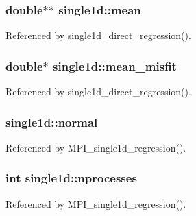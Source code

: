 \subsubsection[{\texorpdfstring{mean}{mean}}]{\setlength{\rightskip}{0pt plus 5cm}double$\ast$$\ast$ single1d\+::mean}\hypertarget{structsingle1d_a0ea2ba7f58645cefcfc9ce5d4a602976}{}\label{structsingle1d_a0ea2ba7f58645cefcfc9ce5d4a602976}


Referenced by single1d\+\_\+direct\+\_\+regression().

\subsubsection[{\texorpdfstring{mean\+\_\+misfit}{mean_misfit}}]{\setlength{\rightskip}{0pt plus 5cm}double$\ast$ single1d\+::mean\+\_\+misfit}\hypertarget{structsingle1d_a9b27da0ce7a852baa94a71a218103faf}{}\label{structsingle1d_a9b27da0ce7a852baa94a71a218103faf}


Referenced by single1d\+\_\+direct\+\_\+regression().

\subsubsection[{\texorpdfstring{normal}{normal}}]{ single1d\+::normal}\hypertarget{structsingle1d_ad653c8600bea466a1b101a989b215530}{}\label{structsingle1d_ad653c8600bea466a1b101a989b215530}


Referenced by M\+P\+I\+\_\+single1d\+\_\+regression().

\subsubsection[{\texorpdfstring{nprocesses}{nprocesses}}]{\setlength{\rightskip}{0pt plus 5cm}int single1d\+::nprocesses}\hypertarget{structsingle1d_a13f9d4b58029ca02041818e2626869b8}{}\label{structsingle1d_a13f9d4b58029ca02041818e2626869b8}


Referenced by M\+P\+I\+\_\+single1d\+\_\+regression().

